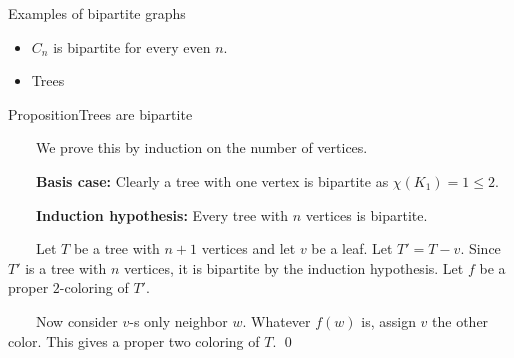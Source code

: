 \documentclass{beamer}
\def\bl[#1]#2{\begin{block}{#1}#2\end{block}}
\def\itemb{\begin{itemize}}
\def\iteme{\end{itemize}}
\begin{document}
\begin{frame}{Examples of bipartite graphs}
\itemb
\item $C_n$ is bipartite for every even $n$.
\item Trees
\iteme
\bl[Proposition]{Trees are bipartite}
~~~~We prove this by induction on the number of vertices.

~~~~\textbf{Basis case:} Clearly a tree with one vertex is bipartite as $\chi(K_1)=1\leq 2$.

~~~~\textbf{Induction hypothesis:} Every tree with $n$ vertices is bipartite.

~~~~Let $T$ be a tree with $n+1$ vertices and let $v$ be a leaf. Let $T'=T-v$. Since $T'$ is a tree with $n$ vertices, it is bipartite by the induction hypothesis. Let $f$ be a proper $2$-coloring of $T'$. 

~~~~Now consider $v$-s only neighbor $w$. Whatever $f(w)$ is, assign $v$ the other color. This gives a proper two coloring of $T$. \qed
\end{frame}
\end{document}
